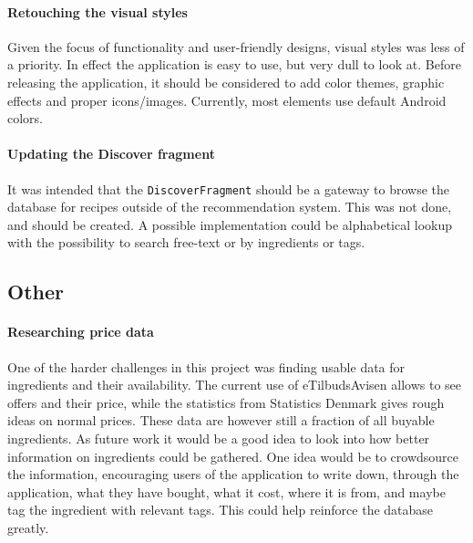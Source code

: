 \paragraph{Retouching the visual styles}
Given the focus of functionality and user-friendly designs, visual styles was less of a priority. In effect the application is easy to use, but very dull to look at. Before releasing the application, it should be considered to add color themes, graphic effects and proper icons/images. Currently, most elements use default Android colors.

\paragraph{Updating the Discover fragment}
It was intended that the \texttt{DiscoverFragment} should be a gateway to browse the database for recipes outside of the recommendation system. This was not done, and should be created. A possible implementation could be alphabetical lookup with the possibility to search free-text or by ingredients or tags.

\subsection{Other}

\paragraph{Researching price data}
One of the harder challenges in this project was finding usable data for ingredients and their availability. The current use of eTilbudsAvisen allows to see offers and their price, while the statistics from Statistics Denmark gives rough ideas on normal prices.
These data are however still a fraction of all buyable ingredients. As future work it would be a good idea to look into how better information on ingredients could be gathered.
One idea would be to crowdsource the information, encouraging users of the application to write down, through the application, what they have bought, what it cost, where it is from, and maybe tag the ingredient with relevant tags. This could help reinforce the database greatly.